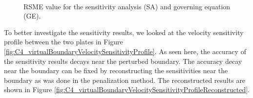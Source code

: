 \begin{figure}[H]
    \centering
    \\
    \caption{RSME value for the sensitivity analysis (SA) and governing equation (GE).}
    \label{fig:C4_virtualBoundarySAconvergence}
\end{figure}

To better investigate the sensitivity results, we looked at the velocity sensitivity profile between the two plates in Figure \ref{fig:C4_virtualBoundaryVelocitySensitivityProfile}. As seen here, the accuracy of the sensitivity results decays near the perturbed boundary. The accuracy decay near the boundary can be fixed by reconstructing the sensitivities near the boundary as was done in the penalization method. The reconstructed results are shown in Figure \ref{fig:C4_virtualBoundaryVelocitySensitivityProfileReconstructed}.

